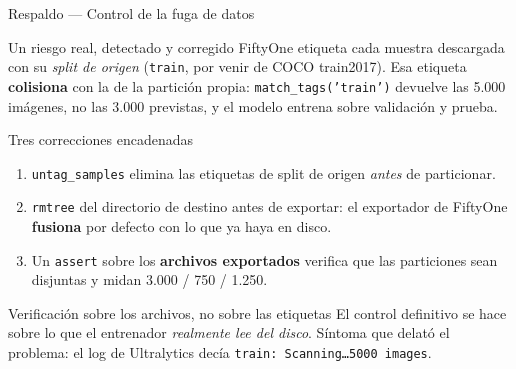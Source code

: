 \documentclass[aspectratio=169,11pt]{beamer}
\begin{document}
\begin{frame}{Respaldo --- Control de la fuga de datos}
  \begin{alertblock}{Un riesgo real, detectado y corregido}
    \footnotesize
    FiftyOne etiqueta cada muestra descargada con su \emph{split de origen}
    (\texttt{train}, por venir de COCO train2017). Esa etiqueta \textbf{colisiona} con la
    de la partición propia: \texttt{match\_tags('train')} devuelve las 5.000 imágenes, no
    las 3.000 previstas, y el modelo entrena sobre validación y prueba.
  \end{alertblock}

  \vspace{0.4em}
  \begin{block}{Tres correcciones encadenadas}
    \footnotesize
    \begin{enumerate}
      \item \texttt{untag\_samples} elimina las etiquetas de split de origen \emph{antes}
            de particionar.
      \item \texttt{rmtree} del directorio de destino antes de exportar: el exportador de
            FiftyOne \textbf{fusiona} por defecto con lo que ya haya en disco.
      \item Un \texttt{assert} sobre los \textbf{archivos exportados} verifica que las
            particiones sean disjuntas y midan 3.000 / 750 / 1.250.
    \end{enumerate}
  \end{block}

  \vspace{0.3em}
  \begin{exampleblock}{Verificación sobre los archivos, no sobre las etiquetas}
    \footnotesize
    El control definitivo se hace sobre lo que el entrenador \emph{realmente lee del disco}.
    Síntoma que delató el problema: el log de Ultralytics decía
    \texttt{train: Scanning\ldots 5000 images}.
  \end{exampleblock}
\end{frame}
\end{document}
